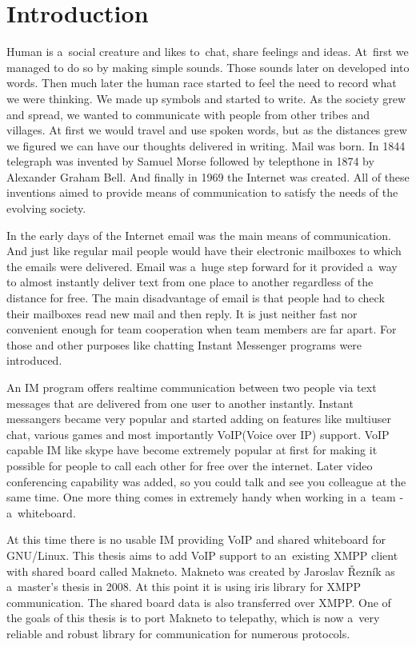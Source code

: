 \linenumbers
\chapter{Introduction}
Human is a~social creature and likes to~chat, share feelings and ideas. At~first we managed to do so by making simple sounds. Those sounds later on developed into words. Then much later the human race started to feel the need to record what we were thinking. We made up symbols and started to write. As the society grew and spread, we wanted to communicate with people from other tribes and villages. At first we would travel and use spoken words, but as the distances grew we figured we can have our thoughts delivered in writing. Mail was born. In 1844 telegraph was invented by Samuel Morse followed by telepthone in 1874 by Alexander Graham Bell. And finally in 1969 the Internet was created. All of these inventions aimed to provide means of communication to satisfy the needs of the evolving society.  

In the early days of the Internet email was the main means of communication. And just like regular mail people would have their electronic mailboxes to which the emails were delivered. Email was a~huge step forward for it provided a~way to almost instantly deliver text from one place to another regardless of the distance for free. The main disadvantage of email is that people had to check their mailboxes read new mail and then reply. It is just neither fast nor convenient enough for team cooperation when team members are far apart. For those and other purposes like chatting Instant Messenger programs were introduced.    

An IM program offers realtime communication between two people via text messages that are delivered from one user to another instantly. Instant messangers became very popular and started adding on features like multiuser chat, various games and most importantly VoIP(Voice over IP) support. VoIP capable IM like skype have become extremely popular at first for making it possible for people to call each other for free over the internet. Later video conferencing capability was added, so you could talk and see you colleague at the same time. One more thing comes in extremely handy when working in a~team - a~whiteboard.

At this time there is no usable IM providing VoIP and shared whiteboard for GNU/Linux. This thesis aims to add VoIP support to an~existing XMPP client with shared board called Makneto. Makneto was created by Jaroslav Řezník as a~master's thesis in 2008. At this point it is using iris library for XMPP communication. The shared board data is also transferred over XMPP. One of the goals of this thesis is to port Makneto to telepathy, which is now a~very reliable and robust library for communication for numerous protocols.  

